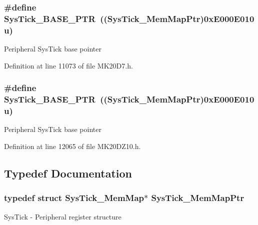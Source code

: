 \subsubsection[{\texorpdfstring{Sys\+Tick\+\_\+\+B\+A\+S\+E\+\_\+\+P\+TR}{SysTick_BASE_PTR}}]{\setlength{\rightskip}{0pt plus 5cm}\#define Sys\+Tick\+\_\+\+B\+A\+S\+E\+\_\+\+P\+TR~(({\bf Sys\+Tick\+\_\+\+Mem\+Map\+Ptr})0x\+E000\+E010u)}\hypertarget{group___sys_tick___peripheral_gaeef73642fdef722ce658e468dad877ea}{}\label{group___sys_tick___peripheral_gaeef73642fdef722ce658e468dad877ea}
Peripheral Sys\+Tick base pointer 

Definition at line 11073 of file M\+K20\+D7.\+h.

\subsubsection[{\texorpdfstring{Sys\+Tick\+\_\+\+B\+A\+S\+E\+\_\+\+P\+TR}{SysTick_BASE_PTR}}]{\setlength{\rightskip}{0pt plus 5cm}\#define Sys\+Tick\+\_\+\+B\+A\+S\+E\+\_\+\+P\+TR~(({\bf Sys\+Tick\+\_\+\+Mem\+Map\+Ptr})0x\+E000\+E010u)}\hypertarget{group___sys_tick___peripheral_gaeef73642fdef722ce658e468dad877ea}{}\label{group___sys_tick___peripheral_gaeef73642fdef722ce658e468dad877ea}
Peripheral Sys\+Tick base pointer 

Definition at line 12065 of file M\+K20\+D\+Z10.\+h.



\subsection{Typedef Documentation}
\subsubsection[{\texorpdfstring{Sys\+Tick\+\_\+\+Mem\+Map\+Ptr}{SysTick_MemMapPtr}}]{\setlength{\rightskip}{0pt plus 5cm}typedef struct {\bf Sys\+Tick\+\_\+\+Mem\+Map}$\ast$ {\bf Sys\+Tick\+\_\+\+Mem\+Map\+Ptr}}\hypertarget{group___sys_tick___peripheral_ga19e2a0c9400dcdfd462a92ca83cff253}{}\label{group___sys_tick___peripheral_ga19e2a0c9400dcdfd462a92ca83cff253}
Sys\+Tick -\/ Peripheral register structure 
